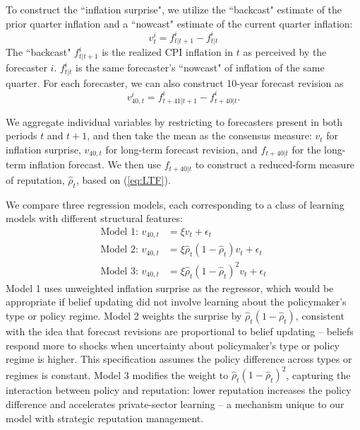 \documentclass[12pt,letter,leqno]{article}
\theoremstyle{asn}
\theoremstyle{lem}
\theoremstyle{slem}
\theoremstyle{prop}
\theoremstyle{appprop}
\theoremstyle{rem}
\theoremstyle{defn}
\begin{document}
To construct the ``inflation surprise", we utilize the ``backcast" estimate of the prior quarter inflation and a ``nowcast" estimate of the current quarter inflation: 
\[
v_{t}^{i}=f_{t|t+1}^{i}-f_{t|t}^{i}
\]
The ``backcast" $f_{t|t+1}^{i}$ is the realized CPI inflation in $t$ as perceived by the forecaster $i$. $f_{t|t}^{i}$ is the same forecaster's ``nowcast" of inflation of the same quarter. 
For each forecaster, we can also construct 10-year forecast revision as
\[
v_{40,t}^{i}=f_{t+41|t+1}^{i}-f_{t+40|t}^{i}.
\]

We aggregate individual variables by restricting to forecasters present in both periods $t$ and $t+1$, and then take the mean as the consensus measure: $v_t$ for inflation surprise, $v_{40,t}$ for long-term forecast revision, and $f_{t+40|t}$ for the long-term inflation forecast. We then use $f_{t+40|t}$ to construct a reduced-form measure of reputation, $\widehat{\rho}_t$, based on (\ref{eq:LTF}).



We compare three regression models, each corresponding to a class of learning models with different structural features:
\begin{align*}
     \text{Model 1: }v_{40,t}&=\xi v_t + \epsilon_t \\
     \text{Model 2: }v_{40,t}&=\xi \widehat{\rho}_t(1-\widehat{\rho}_t) v_t + \epsilon_t \\
     \text{Model 3: }v_{40,t}&=\xi \widehat{\rho}_t(1-\widehat{\rho}_t)^2 v_t + \epsilon_t
\end{align*}
Model 1 uses unweighted inflation surprise as the regressor, which would be appropriate if belief updating did not involve learning about the policymaker’s type or policy regime. Model 2 weights the surprise by $\widehat{\rho}_t(1 - \widehat{\rho}_t)$, consistent with the idea that forecast revisions are proportional to belief updating -- beliefs respond more to shocks when uncertainty about policymaker's type or policy regime is higher. This specification assumes the policy difference across types or regimes is constant. Model 3 modifies the weight to $\widehat{\rho}_t(1 - \widehat{\rho}_t)^2$, capturing the interaction between policy and reputation: lower reputation increases the policy difference and accelerates private-sector learning -- a mechanism unique to our model with strategic reputation management.
\end{document}
